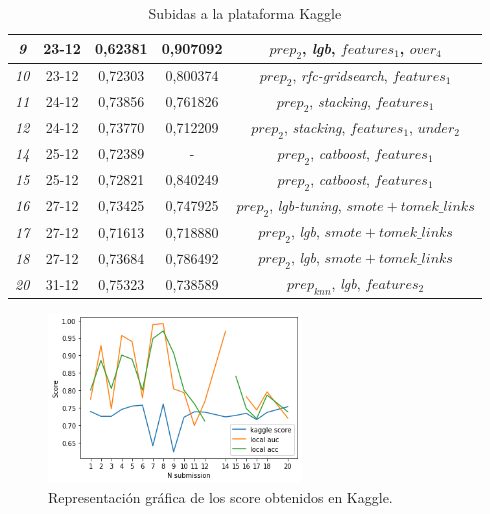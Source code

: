 \begin{table}[H]
\begin{tabular}{|c|c|c|c|c|}
\textit{9}          & 23-12         & {\color[HTML]{F00000} 0,62381}    & 0,907092             &        $prep_{2}$, \textit{lgb}, $features_{1}$, $over_{4}$              \\ \hline
\textit{10}         & 23-12         & {\color[HTML]{134F5C} 0,72303} & 0,800374             &       $prep_{2}$, \textit{rfc-gridsearch}, $features_{1}$               \\ \hline
\textit{11}         & 24-12         & {\color[HTML]{134F5C} 0,73856} & 0,761826             &       $prep_{2}$, \textit{stacking}, $features_{1}$               \\ \hline
\textit{12}         & 24-12         & {\color[HTML]{134F5C} 0,73770} & 0,712209             &      $prep_{2}$, \textit{stacking}, $features_{1}$, $under_{2}$                \\ \hline
\textit{14}         & 25-12         & {\color[HTML]{134F5C} 0,72389} & -             &             $prep_{2}$, \textit{catboost}, $features_{1}$                        \\ \hline
\textit{15}         & 25-12         & {\color[HTML]{134F5C} 0,72821} & 0,840249             &           $prep_{2}$, \textit{catboost}, $features_{1}$                          \\ \hline
\textit{16}         & 27-12         & {\color[HTML]{134F5C} 0,73425} & 0,747925             &       $prep_{2}$, \textit{lgb-tuning}, $smote+tomek\_ links$               \\ \hline
\textit{17}         & 27-12         & {\color[HTML]{134F5C} 0,71613} & 0,718880             &         $prep_{2}$, \textit{lgb}, $smote+tomek\_ links$ \\ \hline
\textit{18}         & 27-12         & {\color[HTML]{134F5C} 0,73684} & 0,786492             &      $prep_{2}$, \textit{lgb}, $smote+tomek\_ links$                \\ \hline
\textit{20}         & 31-12         & {\color[HTML]{134F5C} 0,75323} & 0,738589             &           $prep_{knn}$, \textit{lgb}, $features_{2}$          \\ \hline
\end{tabular}
\caption{Subidas a la plataforma Kaggle}
\end{table}

\begin{figure}[H]
\centering
\includegraphics[width=0.6\textwidth]{imagenes/subs-graph.png}
\caption{Representación gráfica de los score obtenidos en Kaggle.}
\end{figure}


